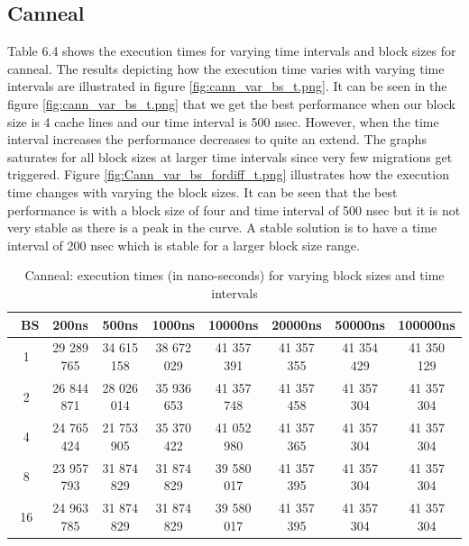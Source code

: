 \documentclass{listhesis}
\begin{document}
\subsection{Canneal}
Table 6.4 shows the execution times for varying time intervals and block sizes for canneal. The results depicting how the execution time varies with varying time intervals are illustrated in figure \ref{fig:cann_var_bs_t.png}. It can be seen in the figure \ref{fig:cann_var_bs_t.png} that we get the best performance when our block size is 4 cache lines and our time interval is 500 nsec. However, when the time interval increases the performance decreases to quite an extend. The graphs saturates for all block sizes at larger time intervals since very few migrations get triggered. Figure \ref{fig:Cann_var_bs_fordiff_t.png} illustrates how the execution time changes with varying the block sizes. It can be seen that the best performance is with a block size of four and time interval of 500 nsec but it is not very stable as there is a peak in the curve. A stable solution is to have a time interval of 200 nsec which is stable for a larger block size range. 

\begin{table}[h!]
\begin{center}
 \begin{tabular}{|| c | c | c | c| c | c | c | c||} 
 \hline
 \ \textbf{BS} & \textbf{200ns} & \textbf{500ns}  & \textbf{1000ns} & \textbf{10000ns} & \textbf{20000ns} & \textbf{50000ns} & \textbf{100000ns}\\ [0.5 ex] 
 \hline\hline
   1 & 29 289 765 & 34 615 158 &  38 672 029 & 41 357 391 & 41 357 355 & 41 354 429 &  41 350 129 \\ 
 \hline
   2 & 26 844 871 & 28 026 014 & 35 936 653 & 41 357 748 & 41 357 458 & 41 357 304 & 41 357 304 \\
 \hline
   4 & 24 765 424 & 21 753 905 & 35 370 422 & 41 052 980 & 41 357 365 & 41 357 304 & 41 357 304 \\
 \hline
   8 & 23 957 793 & 31 874 829 & 31 874 829 & 39 580 017 & 41 357 395 & 41 357 304 & 41 357 304 \\
  \hline
   16 & 24 963 785 & 31 874 829 & 31 874 829 & 39 580 017 & 41 357 395 & 41 357 304 & 41 357 304 \\
    \hline
\end{tabular}
 \caption{Canneal: execution times (in nano-seconds) for varying block sizes and time intervals}
 \label{table:ExecTimes2}
\end{center}
\end{table}
\end{document}
